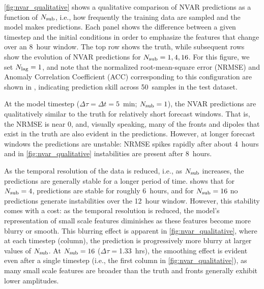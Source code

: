 \cref{fig:nvar_qualitative} shows a qualitative comparison of NVAR predictions
as a function of $N_\text{sub}$, i.e., how frequently the training data are sampled and
the model makes predictions.
Each panel shows the difference between a given timestep and the initial
conditions in order to emphasize the features that change over an 8~hour window.
The top row shows the truth, while subsequent rows show the evolution of NVAR
predictions for $N_\text{sub}=1,4,16$.
For this figure, we set $N_\text{lag}=1$, and note that the normalized root-mean-square
error (NRMSE) and Anomaly Correlation
Coefficient (ACC) corresponding to this configuration are shown in ,
indicating prediction skill across 50~samples in the test dataset.

At the model timestep ($\Delta \tau = \Delta t = 5$~min; $N_\text{sub}=1$), the NVAR predictions are
qualitatively similar to the truth for relatively short forecast windows.
That is, the NRMSE is near 0, and, visually speaking,
many of the fronts and dipoles that exist in the truth are also evident
in the predictions.
However, at longer forecast windows the predictions are unstable: NRMSE spikes
rapidly after about 4~hours and in \cref{fig:nvar_qualitative} instabilities are
present after 8~hours.

As the temporal resolution of the data is reduced, i.e., as $N_\text{sub}$ increases,
the predictions are generally stable for a longer period of time.
 shows that for $N_\text{sub}=4$, predictions are stable for roughly
6~hours, and for $N_\text{sub}=16$ no predictions generate instabilities over the
12~hour window.
However, this stability comes with a cost: as the temporal resolution is
reduced, the model's representation of small scale features diminishes as these
features become more blurry or smooth.
This blurring effect is apparent in \cref{fig:nvar_qualitative}, where at each
timestep (column), the prediction is progressively more blurry at larger values
of $N_\text{sub}$.
At $N_\text{sub}=16$ ($\Delta \tau = $1.33~hrs), the smoothing effect is
evident even after a single timestep (i.e., the first column in
\cref{fig:nvar_qualitative}),
as many small scale features are broader than the truth and fronts generally
exhibit lower amplitudes.

